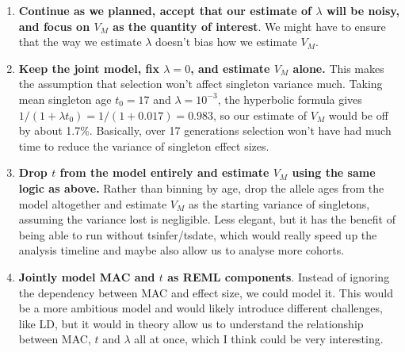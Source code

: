 \documentclass{article}
\begin{document}
\begin{enumerate}
    \item \textbf{Continue as we planned, accept that our estimate of $\lambda$ will be noisy, and focus on $V_M$ as the quantity of interest}. We might have to ensure that the way we estimate $\lambda$ doesn't bias how we estimate $V_M$.
    \item \textbf{Keep the joint model, fix $\lambda = 0$, and estimate $V_M$ alone.} This makes the assumption that selection won't affect singleton variance much. Taking mean singleton age $t_0 = 17$ and $\lambda = 10^{-3}$, the hyperbolic formula gives $1/(1 + \lambda t_0) = 1/(1+0.017) = 0.983$, so our estimate of $V_M$ would be off by about 1.7\%. Basically, over 17 generations selection won't have had much time to reduce the variance of singleton effect sizes.
    \item \textbf{Drop $t$ from the model entirely and estimate $V_M$ using the same logic as above.} Rather than binning by age, drop the allele ages from the model altogether and estimate $V_M$ as the starting variance of singletons, assuming the variance lost is negligible. Less elegant, but it has the benefit of being able to run without tsinfer/tsdate, which would really speed up the analysis timeline and maybe also allow us to analyse more cohorts.
    \item \textbf{Jointly model MAC and $t$ as REML components}. Instead of ignoring the dependency between MAC and effect size, we could model it. This would be a more ambitious model and would likely introduce different challenges, like LD, but it would in theory allow us to understand the relationship between MAC, $t$ and $\lambda$ all at once, which I think could be very interesting.
\end{enumerate}
\end{document}
